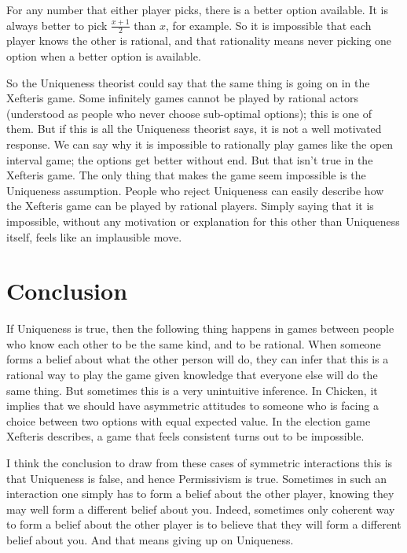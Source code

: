\documentclass[
  11pt,
]{article}
\begin{document}
For any number that either player picks, there is a better option available. It is always better to pick \(\frac{x+1}{2}\) than \(x\), for example. So it is impossible that each player knows the other is rational, and that rationality means never picking one option when a better option is available.

So the Uniqueness theorist could say that the same thing is going on in the Xefteris game. Some infinitely games cannot be played by rational actors (understood as people who never choose sub-optimal options); this is one of them. But if this is all the Uniqueness theorist says, it is not a well motivated response. We can say why it is impossible to rationally play games like the open interval game; the options get better without end. But that isn't true in the Xefteris game. The only thing that makes the game seem impossible is the Uniqueness assumption. People who reject Uniqueness can easily describe how the Xefteris game can be played by rational players. Simply saying that it is impossible, without any motivation or explanation for this other than Uniqueness itself, feels like an implausible move.

\hypertarget{conclusion}{%
\section{Conclusion}\label{conclusion}}

If Uniqueness is true, then the following thing happens in games between people who know each other to be the same kind, and to be rational. When someone forms a belief about what the other person will do, they can infer that this is a rational way to play the game given knowledge that everyone else will do the same thing. But sometimes this is a very unintuitive inference. In Chicken, it implies that we should have asymmetric attitudes to someone who is facing a choice between two options with equal expected value. In the election game Xefteris describes, a game that feels consistent turns out to be impossible.

I think the conclusion to draw from these cases of symmetric interactions this is that Uniqueness is false, and hence Permissivism is true. Sometimes in such an interaction one simply has to form a belief about the other player, knowing they may well form a different belief about you. Indeed, sometimes only coherent way to form a belief about the other player is to believe that they will form a different belief about you. And that means giving up on Uniqueness.
\end{document}
